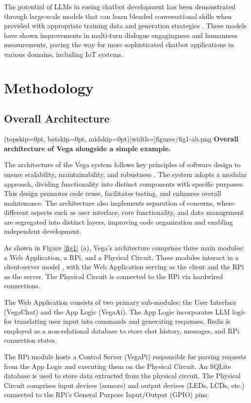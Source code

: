 \documentclass{ieeeaccess}
\begin{document}
The potential of LLMs in easing chatbot development has been demonstrated through large-scale models that can learn blended conversational skills when provided with appropriate training data and generation strategies \cite{roller-etal-2021-recipes}. These models have shown improvements in multi-turn dialogue engagingness and humanness measurements, paving the way for more sophisticated chatbot applications in various domains, including IoT systems. 


\section{Methodology}
\label{sec:methodology}
\subsection{Overall Architecture}
\Figure[t!](topskip=0pt, botskip=0pt, midskip=0pt)[width=\textwidth]{{figures/fig1-ab.png}}
{ \textbf{Overall architecture of Vega alongside a simple example.}\label{fig1}}

The architecture of the Vega system follows key principles of software design to ensure scalability, maintainability, and robustness \cite{taylor2010software}. The system adopts a modular approach, dividing functionality into distinct components with specific purposes. This design promotes code reuse, facilitates testing, and enhances overall maintenance. The architecture also implements separation of concerns, where different aspects such as user interface, core functionality, and data management are segregated into distinct layers, improving code organization and enabling independent development.

As shown in Figure \ref{fig1} (a), Vega's architecture comprises three main modules: a Web Application, a RPi, and a Physical Circuit. These modules interact in a client-server model \cite{tanenbaum2002distributed}, with the Web Application serving as the client and the RPi as the server. The Physical Circuit is connected to the RPi via hardwired connections.

The Web Application consists of two primary sub-modules: the User Interface (VegaChat) and the App Logic (VegaAi). The App Logic incorporates LLM logic for translating user input into commands and generating responses. Redis \cite{6106531} is employed as a non-relational database to store chat history, messages, and RPi connection states.

The RPi module hosts a Control Server (VegaPi) responsible for parsing requests from the App Logic and executing them on the Physical Circuit. An SQLite database \cite{sqlite, sqliteapplication} is used to store data extracted from the physical circuit. The Physical Circuit comprises input devices (sensors) and output devices (LEDs, LCDs, etc.) connected to the RPi's General Purpose Input/Output (GPIO) pins.
\end{document}
